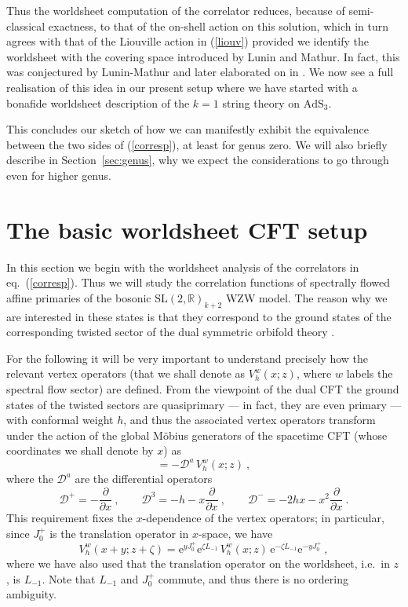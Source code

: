 \documentclass[12pt,a4paper]{article}
\newcommand{\be}{\begin{equation}}
\newcommand{\ee}{\end{equation}}
\begin{document}
Thus the worldsheet computation of the correlator reduces, because of semi-classical exactness, to that of the on-shell action on this solution, which in turn agrees with that of the Liouville action in (\ref{liouv}) provided we identify the worldsheet with the covering space introduced by Lunin and Mathur. In fact, this was conjectured by Lunin-Mathur  and later elaborated on in 
\cite{Pakman:2009zz}. We now see a full realisation of this idea in our present setup where we have started with a bonafide worldsheet description of the $k=1$ string theory on $\text{AdS}_3$. 

This concludes our sketch of how we can manifestly exhibit the equivalence between the two sides of (\ref{corresp}), at least for genus zero. We will also briefly describe in Section~\ref{sec:genus}, why we expect the considerations to go through even for higher genus. 


\section{The basic worldsheet CFT setup}\label{sec:setup}

In this section we begin with the worldsheet analysis of the correlators in eq.~(\ref{corresp}). Thus we will study the correlation functions of spectrally flowed affine primaries of the bosonic $\mathrm{SL}(2,\mathds{R})_{k+2}$ WZW model. The reason why we are interested in these states is that they correspond to the ground states of the corresponding twisted sector of the dual  symmetric orbifold theory \cite{Gaberdiel:2018rqv,Eberhardt:2018ouy}. 

For the following it will be very important to understand precisely how the relevant vertex operators (that we shall denote as $V^w_h(x;z)$, where $w$ labels the spectral flow sector) are defined. From the viewpoint of the dual CFT the ground states of the twisted sectors are quasiprimary --- in fact, they are even primary --- with conformal weight $h$, and thus the associated vertex operators transform under the action of the global M\"obius generators of the spacetime CFT (whose coordinates we shall denote by $x$) as 
\be
[ J^a_0, V^w_h(x;z) ] = -\mathcal{D}^a \, V^w_h(x;z) \ , 
\ee
where the $\mathcal{D}^a$ are the differential operators 
\be \label{eq:xbasis}
\mathcal{D}^+ = -\frac{\partial}{\partial x}\ , \qquad \mathcal{D}^3=-h -x \frac{\partial}{\partial x}\ , \qquad \mathcal{D}^-=-2 h x -x^2 \frac{\partial}{\partial x}\ . 
\ee
This requirement fixes the $x$-dependence of the vertex operators; in particular, since $J^+_0$ is the translation operator in $x$-space, we have 
\be \label{eq:Vtrans}
V_h^w(x+y;z+\zeta)=\mathrm{e}^{y J_0^+} \mathrm{e}^{\zeta L_{-1}} \, V_h^w(x;z)\, \mathrm{e}^{-\zeta L_{-1}}\mathrm{e}^{-y J_0^+} \ ,
\ee
where we have also used that the translation operator on the worldsheet, i.e.\ in $z$, is $L_{-1}$. Note that $L_{-1}$ and $J^+_0$ commute, and thus there is no ordering ambiguity. 
\end{document}
